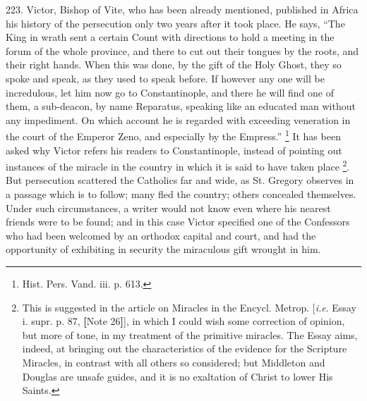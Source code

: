 223.
Victor, Bishop of Vite, who has been already mentioned, published in
Africa his history of the persecution only two years after it took
place. He says, ``The King in wrath sent a certain Count with
directions to hold a meeting in the forum of the whole province, and
there to cut out their tongues by the roots, and their right hands.
When this was done, by the gift of the Holy Ghost, they so spoke and
speak, as they used to speak before. If however any one will be
incredulous, let him now go to Constantinople, and there he will find
one of them, a sub-deacon, by name Reparatus, speaking like an
educated man without any impediment. On which account he is regarded
with exceeding veneration in the court of the Emperor Zeno, and
especially by the Empress.'' \footnote{Hist. Pers. Vand. iii. p. 613.}
It has been asked why Victor refers his readers to Constantinople,
instead of pointing out instances of the miracle in the country in
which it is said to have taken place \footnote{This is suggested in the article on Miracles in the Encycl. Metrop. [\emph{i.e}.
Essay i. supr. p. 87, \textbf{[}Note
26\textbf{]}], in which I could wish
some correction of opinion, but more of tone, in my treatment of the
primitive miracles. The Essay aims, indeed, at bringing out the
characteristics of the evidence for the Scripture Miracles, in
contrast with all others so considered; but Middleton and Douglas are
unsafe guides, and it is no exaltation of Christ to lower His Saints.}. But persecution scattered the Catholics far and wide, as
St. Gregory observes in a passage which is to follow; many fled the
country; others concealed themselves. Under such circumstances, a
writer would not know even where his nearest friends were to be found;
and in this case Victor specified one of the Confessors who had been
welcomed by an orthodox capital and court, and had the opportunity of
exhibiting in security the miraculous gift wrought in him.

